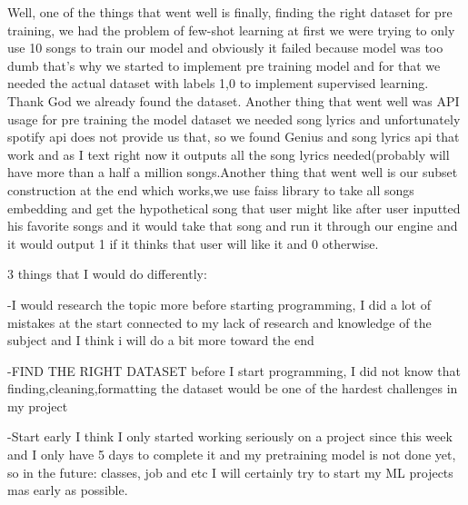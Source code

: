 \documentclass{article}
\begin{document}
Well, one of the things that went well is finally, finding the right dataset for pre training, we had the problem of few-shot learning at first we were trying to only use 10 songs to train our model and obviously it failed because model was too dumb that's why we started to implement pre training model and for that we needed the actual dataset with labels 1,0 to implement supervised learning. Thank God we already found the dataset. Another thing that went well was API usage for pre training the model dataset we needed song lyrics and unfortunately spotify api does not provide us that, so we found Genius and song lyrics api that work and as I text right now it outputs all the song lyrics needed(probably will have more than a half a million songs.Another thing that went well is our subset construction at the end which works,we use faiss library to take all songs embedding and get the hypothetical song that user might like after user inputted his favorite songs and it would take that song and run it through our engine and it would output 1 if it thinks that user will like it and 0 otherwise.

3 things that I would do differently:

-I would research the topic more before starting programming, I did a lot of mistakes at the start connected to my lack of research and knowledge of the subject and I think i will do a bit more toward the end

-FIND THE RIGHT DATASET before I start programming, I did not know that finding,cleaning,formatting the dataset would be  one of the hardest challenges in my project

-Start early I think I only started working seriously on a project since this week and I only have 5 days to complete it and my pretraining model is not done yet, so in the future: classes, job and etc I will certainly try to start my ML projects mas early as possible.
\end{document}
